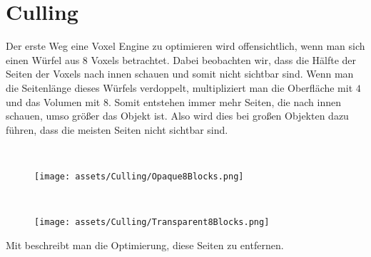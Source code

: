 \newcommand{\minipagespace}[1]{
	\begin{minipage}[c]{#1\textwidth}
		\ 
	\end{minipage}
}

\section{Culling}

Der erste Weg eine Voxel Engine zu optimieren wird
offensichtlich, wenn man sich einen Würfel aus $8$
Voxels betrachtet. Dabei beobachten wir, dass
die Hälfte der Seiten der Voxels nach innen schauen
und somit nicht sichtbar sind. Wenn man die
Seitenlänge dieses Würfels verdoppelt, multipliziert
man die Oberfläche mit $4$ und das Volumen mit $8$.
Somit entstehen immer mehr Seiten, die nach innen
schauen, umso größer das Objekt ist. Also wird
dies bei großen Objekten dazu führen, dass die
meisten Seiten nicht sichtbar sind.

\begin{center}
\begin{figure}[ht]
	\minipagespace{0.04}
	\begin{minipage}[c]{0.4\textwidth}
		\begin{center}
\texttt{[image: assets/Culling/Opaque8Blocks.png]}
		\end{center}
	\end{minipage}
	\minipagespace{0.09}
	\begin{minipage}[c]{0.4\textwidth}
		\begin{center}
\texttt{[image: assets/Culling/Transparent8Blocks.png]}
		\end{center}
	\end{minipage}\hfill
\end{figure}
\end{center}

Mit  beschreibt man die Optimierung,
diese Seiten zu entfernen.

